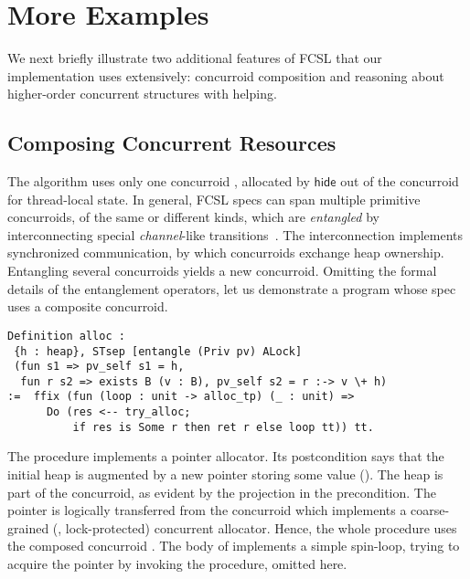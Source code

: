 \section{More Examples}
\label{sec:more-examples}

We next briefly illustrate two additional features of FCSL that our
implementation uses extensively: concurroid composition and reasoning
about higher-order concurrent structures with helping.

\subsection{Composing Concurrent Resources}
\label{sec:comp-conc-reso}

The  algorithm uses only one concurroid ,
allocated by $\mathsf{hide}$ out of the concurroid  for
thread-local state.
%
In general, FCSL specs can span multiple primitive concurroids, of the
same or different kinds, which are \emph{entangled} by interconnecting
special \emph{channel}-like transitions~\cite{Nanevski-al:ESOP14}. The interconnection
implements synchronized communication, by which concurroids 
exchange heap ownership.
%
Entangling several concurroids yields a new concurroid.
%
Omitting the formal details of the entanglement
operators, let us demonstrate a program
whose spec uses a composite concurroid.
%
\begin{lstlisting}
Definition alloc : 
 {h : heap}, STsep [entangle (Priv pv) ALock] 
 (fun s1 => pv_self s1 = h, 
  fun r s2 => exists B (v : B), pv_self s2 = r :-> v \+ h)
:=  ffix (fun (loop : unit -> alloc_tp) (_ : unit) =>
      Do (res <-- try_alloc; 
          if res is Some r then ret r else loop tt)) tt.  
\end{lstlisting}
%
The  procedure implements a pointer allocator. Its
postcondition says that the initial heap  is augmented by a
new pointer  storing some value  (). The
heap  is part of the  concurroid, as evident by the
projection  in the precondition. The pointer  is
logically transferred from the concurroid  which
implements a coarse-grained (\ie, lock-protected) concurrent
allocator. Hence, the whole procedure  uses the composed
concurroid .
%
The body of  implements a simple spin-loop, trying to
acquire the pointer by invoking the  procedure, omitted
here.

